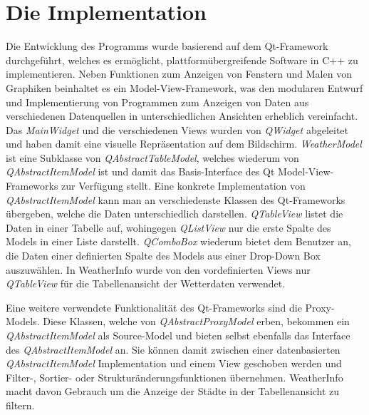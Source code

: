 \documentclass[11pt,a4paper]{scrreprt}
\begin{document}
\chapter{Die Implementation}
Die Entwicklung des Programms wurde basierend auf dem Qt-Framework durchgef\"uhrt,
welches es erm\"oglicht, plattform\"ubergreifende Software in C++ zu implementieren.
Neben Funktionen zum Anzeigen von Fenstern und Malen von Graphiken beinhaltet es ein
Model-View-Framework, was den modularen Entwurf und Implementierung von Programmen
zum Anzeigen von Daten aus verschiedenen Datenquellen in unterschiedlichen Ansichten
erheblich vereinfacht. Das {\itshape MainWidget} und die verschiedenen Views wurden
von {\itshape QWidget} abgeleitet und haben damit eine visuelle Repr\"asentation auf
dem Bildschirm. {\itshape WeatherModel} ist eine Subklasse von {\itshape QAbstractTableModel},
welches wiederum von {\itshape QAbstractItemModel} ist und damit das Basis-Interface
des Qt Model-View-Frameworks zur Verf\"ugung stellt. Eine konkrete Implementation von
{\itshape QAbstractItemModel} kann man an verschiedenste Klassen des Qt-Frameworks
\"ubergeben, welche die Daten unterschiedlich darstellen. {\itshape QTableView} listet
die Daten in einer Tabelle auf, wohingegen {\itshape QListView} nur die erste Spalte
des Models in einer Liste darstellt. {\itshape QComboBox} wiederum bietet dem Benutzer an,
die Daten einer definierten Spalte des Models aus einer Drop-Down Box auszuw\"ahlen.
In WeatherInfo wurde von den vordefinierten Views nur {\itshape QTableView} f\"ur die
Tabellenansicht der Wetterdaten verwendet.

Eine weitere verwendete Funktionalit\"at des Qt-Frameworks sind die Proxy-Models.
Diese Klassen, welche von {\itshape QAbstractProxyModel} erben, bekommen ein {\itshape QAbstractItemModel}
als Source-Model und bieten selbst ebenfalls das Interface des {\itshape QAbstractItemModel}
an. Sie k\"onnen damit zwischen einer datenbasierten {\itshape QAbstractItemModel} Implementation und
einem View geschoben werden und Filter-, Sortier- oder Struktur\"anderungsfunktionen \"ubernehmen.
WeatherInfo macht davon Gebrauch um die Anzeige der St\"adte in der Tabellenansicht zu
filtern.
\end{document}
